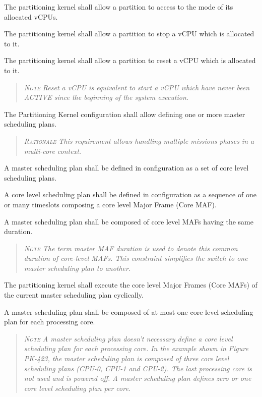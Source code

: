 The partitioning kernel shall allow a partition to access to the mode of its allocated vCPUs.

The partitioning kernel shall allow a partition to stop a vCPU which is allocated to it.

The partitioning kernel shall allow a partition to reset a vCPU which is allocated to it.
\begin{quote}\it
\textsc{Note}
Reset a vCPU is equivalent to start a vCPU which have never been ACTIVE since the beginning of the system execution.
\end{quote}

The Partitioning Kernel configuration shall allow defining one or more master scheduling plans.
\begin{quote}\it
\textsc{Rationale}
This requirement allows handling multiple missions phases in a multi-core context.
\end{quote}

A master scheduling plan shall be defined in configuration as a set of core level scheduling plans.

A core level scheduling plan shall be defined in configuration as a sequence of one or many timeslots composing a core level Major Frame (Core MAF).

A master scheduling plan shall be composed of core level MAFs having the same duration.
\begin{quote}\it
\textsc{Note}
The term master MAF duration is used to denote this common duration of core-level MAFs. This constraint simplifies the switch to one master scheduling plan to another.
\end{quote}

The partitioning kernel shall execute the core level Major Frames (Core MAFs) of the current master scheduling plan cyclically.

A master scheduling plan shall be composed of at most one core level scheduling plan for each processing core.
\begin{quote}\it
\textsc{Note}
A master scheduling plan doesn't necessary define a core level scheduling plan for each processing core. In the example shown in Figure PK-423, the master scheduling plan is composed of three core level scheduling plans (CPU-0, CPU-1 and CPU-2). The last processing core is not used and is powered off. A master scheduling plan defines zero or one core level scheduling plan per core.
\end{quote}

